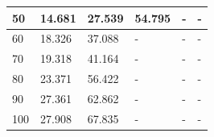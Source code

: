 \begin{table}[H]
\begin{tabular}{|l|l|l|l|l|l|}
50                               & 14.681          & 27.539           & 54.795           & -                & -                \\ \hline
60                               & 18.326          & 37.088           & -                & -                & -                \\ \hline
70                               & 19.318          & 41.164           & -                & -                & -                \\ \hline
80                               & 23.371          & 56.422           & -                & -                & -                \\ \hline
90                               & 27.361          & 62.862           & -                & -                & -                \\ \hline
100                              & 27.908          & 67.835           & -                & -                & -                \\ \hline
\end{tabular}
\end{table}

